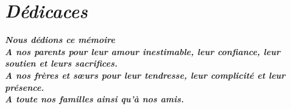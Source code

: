 
\chapter*{\textit{Dédicaces}}



\begin{center}

\textbf{\textit{Nous dédions ce mémoire}}\\



\textbf{\textit{A nos parents pour leur amour inestimable, leur confiance, leur soutien et
leurs sacrifices.}}\\



\textbf{\textit{A nos frères et sœurs  pour leur tendresse, leur complicité et leur présence.}}\\



\textbf{\textit{A toute nos familles ainsi qu'à nos amis.}}


\end{center}